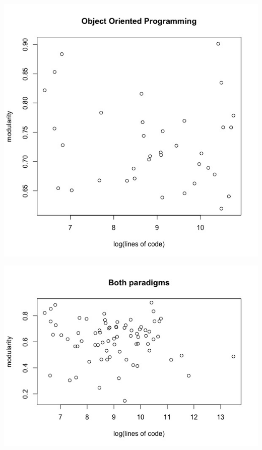 \documentclass[12pt, a4paper]{article}
\begin{document}
  \begin{minipage}[t]{\linewidth}
    \includegraphics[width=\textwidth]{images/oop_lines_code_vs_modularity.jpeg}
    \captionsetup{type=figure}
    \label{fig:oop_log_lines_mod}
  \end{minipage}
  
\begin{minipage}[t]{\linewidth}
    \includegraphics[width=\textwidth]{images/lines_code_vs_modularity.jpeg}
    \captionsetup{type=figure}
    \label{fig:log_lines_mod}
  \end{minipage}
\end{document}
